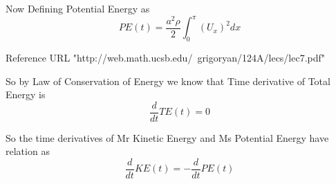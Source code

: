 Now Defining Potential Energy as 
\begin{equation}
     PE(t) = \frac{a^2 \rho}{2}\int_{0}^{\pi}(U_{x})^2dx
\end{equation}

Reference URL "http://web.math.ucsb.edu/~grigoryan/124A/lecs/lec7.pdf" 

So by Law of Conservation of Energy we know that Time derivative of Total Energy is
\begin{equation}
    \frac{d}{dt} TE(t) = 0
\end{equation}

So the time derivatives of Mr Kinetic Energy and Ms Potential Energy have relation as
\begin{equation}
    \frac{d}{dt}KE(t) = - \frac{d}{dt}PE(t)
\end{equation}









